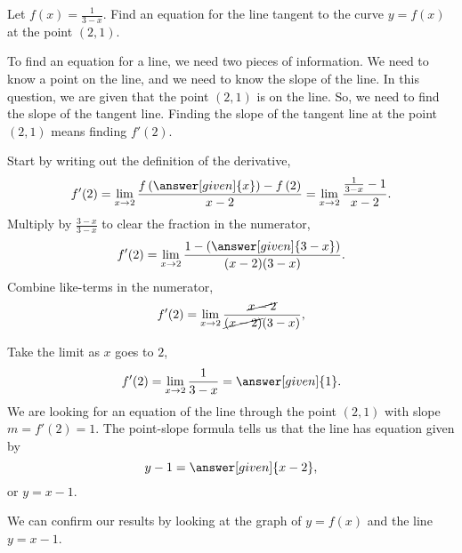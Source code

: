\documentclass{ximera}
\begin{document}
	\begin{example}
	Let $f(x) = \frac{1}{3-x}$.
  Find an equation for the line tangent to the curve $y=f(x)$ at the point $(2, 1)$.
  \begin{explanation}
    To find an equation for a line, we need two pieces of information.  We need to know
    a point on the line, and we need to know the slope of the line.  In this question, we are given
    that  the point $(2,1)$ is on the line.  So, we need to find the slope of the tangent line.
    Finding the slope of the tangent line at the point $(2,1)$ means finding $f'(2)$.
    
    Start by writing out the definition of the derivative,
    \[
    f'(2) = \lim_{x\to 2} \frac{f\left(\answer[given]{x}\right)-f\left(2\right)}{x-2} = \lim_{x\to 2} \frac{\frac{1}{3-x}-1}{x-2}.
    \]
    Multiply by $\frac{3-x}{3-x}$ to clear the fraction in the numerator,
    \[
    f'(2) = \lim_{x\to 2} \frac{1 - \left(\answer[given]{3-x}\right)}{(x-2)(3-x)}.
    \]
    Combine like-terms in the numerator,
    \[
    f'(2) = \lim_{x\to 2} \frac{\cancel{x-2}}{\cancel{(x-2)}(3-x)},
    \]
    	
    Take the limit as $x$ goes to $2$,
    \[
    f'(2)= \lim_{x\to 2} \frac{1}{3-x} = \answer[given]{1}.
    \]
    We are looking for an equation of the line through the point
    $(2,1)$ with slope $m = f'(2) = 1$.  The point-slope formula tells
    us that the line has equation given by
    \[
    y-1= \answer[given]{x-2 },
    \]
    or $y=x-1$.
  \begin{onlineOnly}
  We can confirm our results by looking at the graph of $y=f(x)$ and the line $y=x-1$. 
  \begin{image}
\end{image}
\end{onlineOnly}
\end{explanation}
\end{example}
\end{document}
